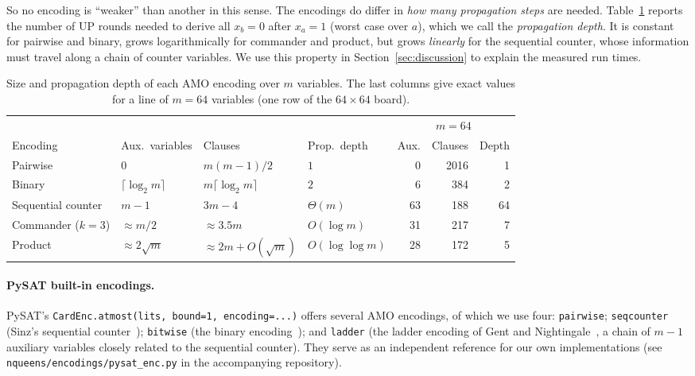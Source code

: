 So no encoding is ``weaker'' than another in this sense. The encodings do differ in \emph{how many propagation steps} are needed. Table~\ref{tab:amo} reports the number of UP rounds needed to derive all $x_b=0$ after $x_a=1$ (worst case over $a$), which we call the \emph{propagation depth}. It is constant for pairwise and binary, grows logarithmically for commander and product, but grows \emph{linearly} for the sequential counter, whose information must travel along a chain of counter variables. We use this property in Section~\ref{sec:discussion} to explain the measured run times.

\begin{table}[pos=htbp]
\caption{Size and propagation depth of each AMO encoding over $m$ variables. The last columns give exact values for a line of $m=64$ variables (one row of the $64\times64$ board).}\label{tab:amo}
\centering
\begin{tabular}{llllrrr}
\toprule
 & & & & \multicolumn{3}{c}{$m=64$} \\
\cmidrule(lr){5-7}
Encoding & Aux.\ variables & Clauses & Prop.\ depth & Aux. & Clauses & Depth \\
\midrule
Pairwise           & $0$                    & $m(m-1)/2$             & $1$ & 0 & 2016 & 1 \\
Binary             & $\lceil\log_2 m\rceil$ & $m\lceil\log_2 m\rceil$ & $2$ & 6 & 384 & 2 \\
Sequential counter & $m-1$                  & $3m-4$                 & $\Theta(m)$ & 63 & 188 & 64 \\
Commander ($k=3$)  & $\approx m/2$          & $\approx 3.5m$         & $O(\log m)$ & 31 & 217 & 7 \\
Product            & $\approx 2\sqrt m$     & $\approx 2m+O(\sqrt m)$ & $O(\log\log m)$ & 28 & 172 & 5 \\
\bottomrule
\end{tabular}
\end{table}

\paragraph{PySAT built-in encodings.}
PySAT's \texttt{CardEnc.atmost(lits, bound=1, encoding=...)} offers several AMO encodings, of which we use four: \texttt{pairwise}; \texttt{seqcounter} (Sinz's sequential counter~\cite{sinz2005}); \texttt{bitwise} (the binary encoding~\cite{frisch2010}); and \texttt{ladder} (the ladder encoding of Gent and Nightingale~\cite{gent2004}, a chain of $m-1$ auxiliary variables closely related to the sequential counter). They serve as an independent reference for our own implementations (see \texttt{nqueens/encodings/pysat\_enc.py} in the accompanying repository).

